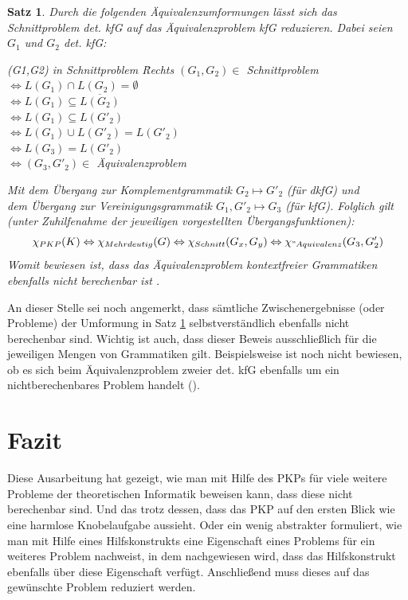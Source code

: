 \documentclass[]{scrartcl}
\newtheorem{satz}[definition]{Satz}
\begin{document}
		\begin{satz}
		\label{satz-aequivalenz}
			Durch die folgenden Äquivalenzumformungen lässt sich das Schnittproblem det. kfG auf das Äquivalenzproblem kfG reduzieren. Dabei seien $G_1$ und $G_2$ det. kfG:
			
			\begin{tabbing}
				(G1,G2) in Schnittproblem \= Rechts \kill
				$(G_1, G_2) \in$ Schnittproblem \>$\Leftrightarrow L(G_1) \cap L(G_2) = \emptyset$ \\
												\>$\Leftrightarrow L(G_1) \subseteq \overline{L(G_2)}$ \\
												\>$\Leftrightarrow L(G_1) \subseteq L(G'_2)$ \\
												\>$\Leftrightarrow L(G_1) \cup L(G'_2) = L(G'_2)$ \\
												\>$\Leftrightarrow L(G_3) = L(G'_2)$ \\
												\>$\Leftrightarrow (G_3, G'_2) \in$ Äquivalenzproblem 
			\end{tabbing}
				Mit dem Übergang zur Komplementgrammatik $G_2 \mapsto G'_2$ (für dkfG) und\\				
				dem Übergang zur Vereinigungsgrammatik $G_1, G'_2 \mapsto G_3$ (für kfG).
			Folglich gilt (unter Zuhilfenahme der jeweiligen vorgestellten Übergangsfunktionen):
			\[
				\chi_{PKP}(K) \Leftrightarrow \chi_{Mehrdeutig}(G) \Leftrightarrow \chi_{Schnitt}(G_x, G_y) \Leftrightarrow \chi_{"Aquivalenz}(G_3, G'_2)
			\]
			Womit bewiesen ist, dass das Äquivalenzproblem kontextfreier Grammatiken ebenfalls nicht berechenbar ist \cite{schoening}.
		\end{satz}

		An dieser Stelle sei noch angemerkt, dass sämtliche Zwischenergebnisse (oder Probleme) der Umformung in Satz \ref{satz-aequivalenz} selbstverständlich ebenfalls nicht berechenbar sind. Wichtig ist auch, dass dieser Beweis ausschließlich für die jeweiligen Mengen von Grammatiken gilt. Beispielsweise ist noch nicht bewiesen, ob es sich beim Äquivalenzproblem zweier det. kfG ebenfalls um ein nichtberechenbares Problem handelt (\cite{schoening}).

\section{Fazit}

	Diese Ausarbeitung hat gezeigt, wie man mit Hilfe des PKPs für viele weitere Probleme der theoretischen Informatik beweisen kann, dass diese nicht berechenbar sind. Und das trotz dessen, dass das PKP auf den ersten Blick wie eine harmlose Knobelaufgabe aussieht. Oder ein wenig abstrakter formuliert, wie man mit Hilfe eines Hilfskonstrukts eine Eigenschaft eines Problems für ein weiteres Problem nachweist, in dem nachgewiesen wird, dass das Hilfskonstrukt ebenfalls über diese Eigenschaft verfügt. Anschließend muss dieses auf das gewünschte Problem reduziert werden.

\def\refname{Literaturverzeichnis}
\printbibliography    
\end{document}
